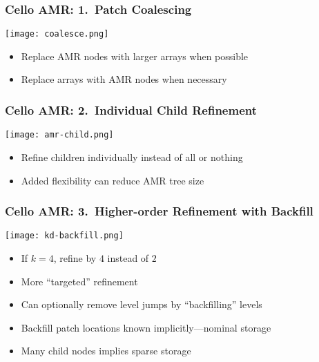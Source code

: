 \begin{frame}[fragile] \frametitle{Cello AMR: 1.~Patch Coalescing}
\centerline{\texttt{[image: coalesce.png]}}
\begin{itemize}
\item Replace AMR nodes with larger arrays when possible
\item Replace arrays with AMR nodes when necessary
\end{itemize}
\end{frame}

\begin{frame}[fragile] \frametitle{Cello AMR: 2.~Individual Child Refinement}
\centerline{\texttt{[image: amr-child.png]}}
\begin{itemize}
\item Refine children individually instead of all or nothing
\item Added flexibility can reduce AMR tree size
\end{itemize}
\end{frame}

\begin{frame}[fragile] \frametitle{Cello AMR: 3.~Higher-order Refinement with Backfill}
\centerline{\texttt{[image: kd-backfill.png]}}
\begin{itemize}
\item If $k=4$, refine by $4$ instead of $2$
\item More ``targeted'' refinement
\item Can optionally remove level jumps by ``backfilling'' levels
\item Backfill patch locations known implicitly---nominal storage
\item Many child nodes implies sparse storage
\end{itemize}
\end{frame}
